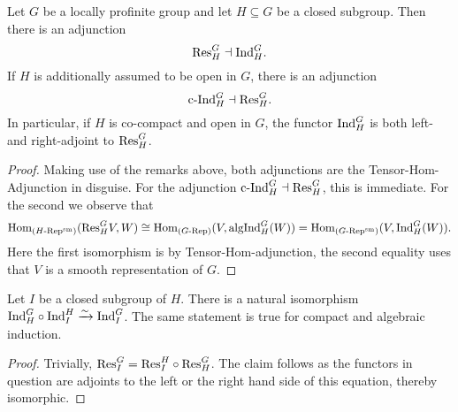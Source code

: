 \documentclass[../main.tex]{subfiles}
\begin{document}
\begin{thm}\label{thm:SmFrobRec}
  Let $G$ be a locally profinite group and let $H \subseteq G$ be a closed subgroup.
  Then there is an adjunction
  \begin{equation*}
    \mathrm{Res}_H^G \dashv \mathrm{Ind}_H^G.
  \end{equation*}
  If $H$ is additionally assumed to be open in $G$, there is an adjunction
  $$\mathrm{c\text{-}Ind}_H^G \dashv \mathrm{Res}_H^G.$$
  In particular, if $H$ is co-compact and open in $G$, the functor $\mathrm{Ind}_H^G$
  is both left- and right-adjoint to $\mathrm{Res}_H^G$.
\begin{proof}
  Making use of the remarks above, both adjunctions are the
  Tensor-Hom-Adjunction in disguise. For the adjunction $\mathrm{c\text{-}Ind}_H^G \dashv
  \mathrm{Res}_H^G$, this is immediate. For the second we observe that
  \begin{equation*}
    \operatorname{Hom}_{{({H}\text-\allowbreak\mathrm{Rep^{\mathrm{sm}}})}}(\mathrm{Res}_H^G V, W) \cong \operatorname{Hom}_{{({G}\text-\allowbreak\mathrm{Rep})}}(V, \mathrm{algInd}_H^G(W)) = 
    \operatorname{Hom}_{{({G}\text-\allowbreak\mathrm{Rep^{\mathrm{sm}}})}}(V, \mathrm{Ind}_H^G(W)).
  \end{equation*}
  Here the first isomorphism is by Tensor-Hom-adjunction, the second 
  equality uses that $V$ is a smooth representation of $G$.
\end{proof}
\end{thm}

\begin{prop}\label{prop:InductionOnTower}
  Let $I$ be a closed subgroup of $H$. There is a natural isomorphism $\mathrm{Ind}_H^G
  \circ \mathrm{Ind}_I^H \xrightarrow{\sim} \mathrm{Ind}_I^G$. 
  The same statement is true for compact and algebraic induction.
  \begin{proof}
    Trivially, $\mathrm{Res}_I^G = \mathrm{Res}_I^H \circ \mathrm{Res}_H^G$. The claim follows as the functors
    in question are adjoints to the left or the right hand side of this equation,
    thereby isomorphic.
  \end{proof}
\end{prop}
\end{document}
